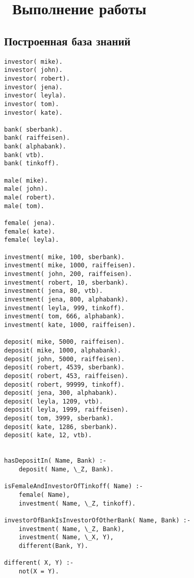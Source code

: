 \chapter{ Выполнение работы}
\label{cha:analysis}

\section{ Построенная база знаний}
\begin{lstlisting}[style=lispStyle, caption={Получение элементов списка с помощью команд car и cdr.},
                    label={lst:thirdtask}]
investor( mike).
investor( john).
investor( robert).
investor( jena).
investor( leyla).
investor( tom).
investor( kate).

bank( sberbank).
bank( raiffeisen).
bank( alphabank).
bank( vtb).
bank( tinkoff).

male( mike).
male( john).
male( robert).
male( tom).

female( jena).
female( kate).
female( leyla).

investment( mike, 100, sberbank).
investment( mike, 1000, raiffeisen).
investment( john, 200, raiffeisen).
investment( robert, 10, sberbank).
investment( jena, 80, vtb).
investment( jena, 800, alphabank).
investment( leyla, 999, tinkoff).
investment( tom, 666, alphabank).
investment( kate, 1000, raiffeisen).

deposit( mike, 5000, raiffeisen).
deposit( mike, 1000, alphabank).
deposit( john, 5000, raiffeisen).
deposit( robert, 4539, sberbank).
deposit( robert, 453, raiffeisen).
deposit( robert, 99999, tinkoff).
deposit( jena, 300, alphabank).
deposit( leyla, 1209, vtb).
deposit( leyla, 1999, raiffeisen).
deposit( tom, 3999, sberbank).
deposit( kate, 1286, sberbank).
deposit( kate, 12, vtb).


hasDepositIn( Name, Bank) :-
    deposit( Name, \_Z, Bank).

isFemaleAndInvestorOfTinkoff( Name) :-
    female( Name),
    investment( Name, \_Z, tinkoff).

investorOfBankIsInvestorOfOtherBank( Name, Bank) :-
    investment( Name, \_Z, Bank),
    investment( Name, \_X, Y),
    different(Bank, Y).
    
different( X, Y) :-
    not(X = Y).
\end{lstlisting}
